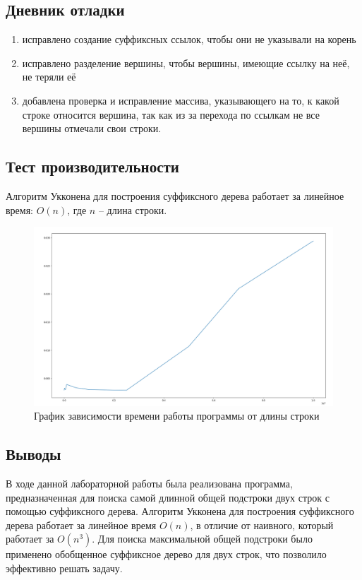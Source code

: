 \documentclass[12pt]{article}
\begin{document}
\subsection*{Дневник отладки}

\begin{enumerate}
    \item исправлено создание суффиксных ссылок, чтобы они не указывали на корень
    \item исправлено разделение вершины, чтобы вершины, имеющие ссылку на неё, не теряли её
    \item добавлена проверка и исправление массива, указывающего на то, к какой строке относится вершина,
          так как из за перехода по ссылкам не все вершины отмечали свои строки.
\end{enumerate}

\newpage
\subsection*{Тест производительности}

Алгоритм Укконена для построения суффиксного дерева работает за линейное время: $O(n)$, где $n$ -- длина строки.
\begin{figure}
    \centering
    \includegraphics[width=\textwidth]{graph.png}
    \caption{График зависимости времени работы программы от длины строки}
\end{figure}

\newpage
\subsection*{Выводы}

В ходе данной лабораторной работы была реализована программа,
предназначенная для поиска самой длинной общей подстроки двух строк
с помощью суффиксного дерева. Алгоритм Укконена для построения
суффиксного дерева работает за линейное время $O(n)$, в отличие от наивного,
который работает за $O(n^3)$.
Для поиска максимальной общей подстроки было применено
обобщенное суффиксное дерево для двух строк,
что позволило эффективно решать задачу.
\end{document}
